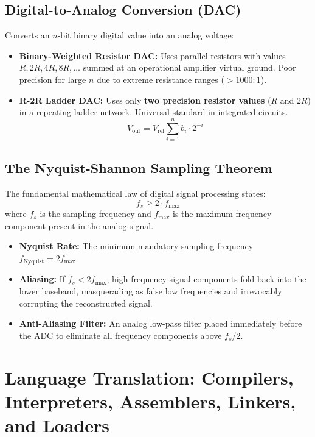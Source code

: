 \subsection{Digital-to-Analog Conversion (DAC)}
Converts an $n$-bit binary digital value into an analog voltage:
\begin{itemize}
    \item \textbf{Binary-Weighted Resistor DAC:} Uses parallel resistors with values $R, 2R, 4R, 8R, \dots$ summed at an operational amplifier virtual ground. Poor precision for large $n$ due to extreme resistance ranges ($>1000:1$).
    \item \textbf{R-2R Ladder DAC:} Uses only \textbf{two precision resistor values} ($R$ and $2R$) in a repeating ladder network. Universal standard in integrated circuits.
    \begin{equation}
    \label{eq:r2r_dac}
    V_{\text{out}} = V_{\text{ref}} \sum_{i=1}^{n} b_i \cdot 2^{-i}
    \end{equation}
\end{itemize}

\subsection{The Nyquist-Shannon Sampling Theorem}
The fundamental mathematical law of digital signal processing states:
\begin{equation}
\label{eq:nyquist_theorem}
\boxed{f_s \ge 2 \cdot f_{\text{max}}}
\end{equation}
where $f_s$ is the sampling frequency and $f_{\text{max}}$ is the maximum frequency component present in the analog signal.
\begin{itemize}
    \item \textbf{Nyquist Rate:} The minimum mandatory sampling frequency $f_{\text{Nyquist}} = 2 f_{\text{max}}$.
    \item \textbf{Aliasing:} If $f_s < 2 f_{\text{max}}$, high-frequency signal components fold back into the lower baseband, masquerading as false low frequencies and irrevocably corrupting the reconstructed signal.
    \item \textbf{Anti-Aliasing Filter:} An analog low-pass filter placed immediately before the ADC to eliminate all frequency components above $f_s / 2$.
\end{itemize}


\section{Language Translation: Compilers, Interpreters, Assemblers, Linkers, and Loaders}
\label{sec:translation_systems}

